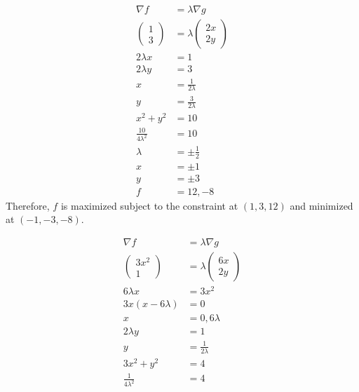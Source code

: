 \documentclass[10pt]{extarticle}
\title{}
\author{Avinash Iyer}
\date{}
\begin{document}
\renewcommand{\arraystretch}{1.5}
  \begin{problem}{15.3}
    \begin{description}[font=\normalfont]
      \item[2:]
        \begin{align*}
          \nabla f &= \lambda \nabla g\\
          \begin{pmatrix}1\\3\end{pmatrix} &= \lambda \begin{pmatrix}2x\\2y\end{pmatrix}\\
          2\lambda x &= 1\\
          2\lambda y &= 3\\
          x &= \frac{1}{2\lambda}\\
          y &= \frac{3}{2\lambda}\\
          x^2 + y^2 &= 10\\
          \frac{10}{4\lambda^2} &= 10\\
          \lambda &= \pm\frac{1}{2}\\
          x &= \pm 1\\
          y &= \pm 3\\
          f &= 12,-8
        \end{align*}
        Therefore, $f$ is maximized subject to the constraint at $(1,3,12)$ and minimized at $(-1,-3,-8)$.
      \item[4:]
        \begin{align*}
          \nabla f &= \lambda \nabla g\\
          \begin{pmatrix}3x^2 \\ 1\end{pmatrix} &= \lambda \begin{pmatrix}6x\\2y\end{pmatrix}\\
          6\lambda x &= 3x^2\\
          3x\left(x - 6\lambda\right) &= 0\\
          x &= 0, 6\lambda\\
          2\lambda y &= 1\\
          y &= \frac{1}{2\lambda}\\
          3x^2 + y^2 &= 4\\
          \frac{1}{4\lambda^2} &= 4 \tag*{$x = 0$}\\

\end{align*}
\end{description}
\end{problem}
\end{document}
